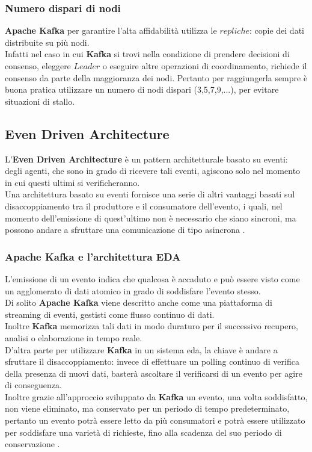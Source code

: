 \subsubsection{Numero dispari di nodi}\label{sec:numero_dispari_nodi}
\textbf{Apache Kafka} per garantire l'alta affidabilità utilizza le $repliche$: copie dei dati distribuite su più nodi.\\
Infatti nel caso in cui \textbf{Kafka} si trovi nella condizione di prendere decisioni di consenso, eleggere $Leader$ o eseguire altre operazioni di coordinamento, richiede il consenso 
da parte della maggioranza dei nodi. Pertanto per raggiungerla sempre è buona pratica utilizzare un numero di nodi dispari (3,5,7,9,...), per evitare situazioni di stallo.\\

\subsection{Even Driven Architecture}
L'\textbf{Even Driven Architecture} è un pattern architetturale basato su eventi: degli agenti, che sono in grado di ricevere tali eventi, agiscono solo nel momento in cui questi ultimi si verificheranno. 
\\Una architettura basato su eventi fornisce una serie di altri vantaggi basati sul disaccoppiamento tra il produttore e il consumatore dell'evento, i quali, nel momento dell'emissione di quest'ultimo non è necessario che siano sincroni, ma possono andare a sfruttare una comunicazione di tipo asincrona \cite{site:Panoramica_architettura_EDA}.
\subsubsection{Apache Kafka e l'architettura EDA}
L'emissione di un evento indica che qualcosa è accaduto e può essere visto come un agglomerato di dati atomico in grado di soddisfare l'evento stesso. \\
Di solito \textbf{Apache Kafka} viene descritto anche come una piattaforma di \gls{streaming di eventi}{}, gestisti come flusso continuo di dati. \\Inoltre \textbf{Kafka} memorizza tali dati in modo duraturo per il successivo recupero, analisi o elaborazione in tempo reale.
\\D'altra parte per utilizzare \textbf{Kafka} in un sistema \gls{eda}{}, la chiave è andare a sfruttare il disaccoppiamento: invece di effettuare un polling continuo di verifica della presenza di nuovi dati, basterà ascoltare il verificarsi di un evento per agire di conseguenza. \\Inoltre grazie all'approccio sviluppato da \textbf{Kafka} un evento, una volta soddisfatto, non viene eliminato, ma conservato per un periodo di tempo predeterminato, pertanto un evento potrà essere letto da più consumatori e potrà essere utilizzato per soddisfare una varietà di richieste, fino alla scadenza del suo periodo di conservazione \cite{site:Kafka_EDA}. \\
\pagebreak
